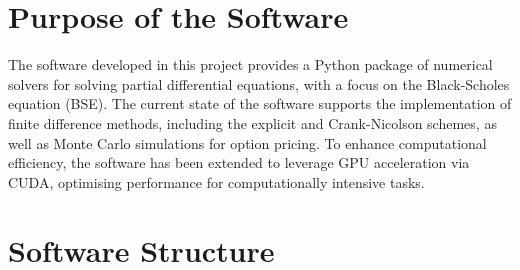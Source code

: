 %


\section{Purpose of the Software}
\label{sec:software_purpose}
The software developed in this project provides a Python package of numerical solvers for solving partial differential equations, with a focus on the Black-Scholes equation (BSE).
The current state of the software supports the implementation of finite difference methods, including the explicit and Crank-Nicolson schemes, as well as Monte Carlo simulations for option pricing.
To enhance computational efficiency, the software has been extended to leverage GPU acceleration via CUDA, optimising performance for computationally intensive tasks. 

\section{Software Structure} \label{sec:software_structure}

